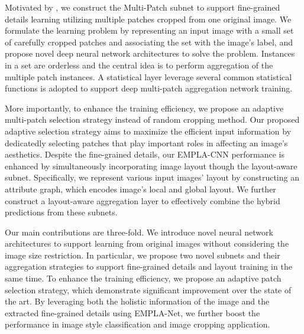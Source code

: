 \documentclass[10pt,twocolumn,letterpaper]{article}
\begin{document}
Motivated by \cite{Lu}, we construct the Multi-Patch subnet to support fine-grained details learning utilizing multiple patches cropped from one original image. We formulate the learning problem by representing an input image with a small set of carefully cropped patches and associating the set with the image's label, and propose novel deep neural network architectures to solve the problem. Instances in a set are orderless and the central idea is to perform aggregation of the multiple patch instances. A statistical layer leverage several common statistical functions is adopted to support deep multi-patch aggregation network training. 

More importantly, to enhance the training efficiency, we propose an adaptive multi-patch selection strategy instead of random cropping method. Our proposed adaptive selection strategy aims to maximize the efficient input information by dedicatedly selecting patches that play important roles in affecting an image's aesthetics. Despite the fine-grained details, our EMPLA-CNN performance is enhanced by simultaneously incorporating image layout though the layout-aware subnet. Specifically, we represent various input images' layout by constructing an attribute graph, which encodes image's local and global layout. We further 
construct a layout-aware aggregation layer to effectively combine the hybrid predictions from these subnets.

Our main contributions are three-fold. We introduce novel neural network architectures to support learning from original images without considering the image size restriction. In particular, we propose two novel subnets and their aggregation strategies to support fine-grained details and layout training in the same time. To enhance the training efficiency, we propose an adaptive patch selection strategy, which demonstrate significant improvement over the state of the art. By leveraging both the holistic information of the image and the extracted fine-grained details using EMPLA-Net, we further boost the 
performance in image style classification and image cropping application.
\end{document}
